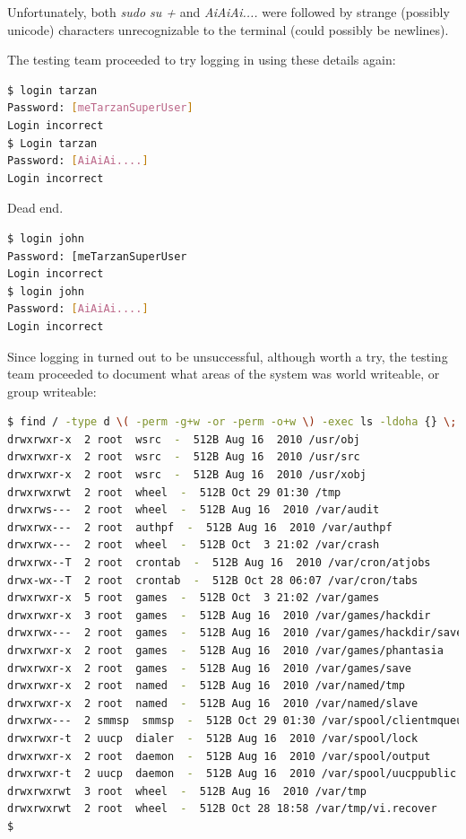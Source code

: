 Unfortunately, both \textit{sudo su +} and \textit{AiAiAi....} were followed by strange (possibly unicode) characters unrecognizable to the terminal (could possibly be newlines).

The testing team proceeded to try logging in using these details again:

\begin{lstlisting}[language=bash,caption={Logging in as tarzan}]
$ login tarzan
Password: [meTarzanSuperUser]
Login incorrect
$ Login tarzan
Password: [AiAiAi....]
Login incorrect
\end{lstlisting}

Dead end. 

\begin{lstlisting}[language=bash,caption={Logging in as john}]
$ login john
Password: [meTarzanSuperUser
Login incorrect
$ login john
Password: [AiAiAi....]
Login incorrect
\end{lstlisting}

Since logging in turned out to be unsuccessful, although worth a try, the testing team proceeded to document what areas of the system was world writeable, or group writeable:
\begin{lstlisting}[language=bash,caption={Where can we go?}]
$ find / -type d \( -perm -g+w -or -perm -o+w \) -exec ls -ldoha {} \;
drwxrwxr-x  2 root  wsrc  -  512B Aug 16  2010 /usr/obj
drwxrwxr-x  2 root  wsrc  -  512B Aug 16  2010 /usr/src
drwxrwxr-x  2 root  wsrc  -  512B Aug 16  2010 /usr/xobj
drwxrwxrwt  2 root  wheel  -  512B Oct 29 01:30 /tmp
drwxrws---  2 root  wheel  -  512B Aug 16  2010 /var/audit
drwxrwx---  2 root  authpf  -  512B Aug 16  2010 /var/authpf
drwxrwx---  2 root  wheel  -  512B Oct  3 21:02 /var/crash
drwxrwx--T  2 root  crontab  -  512B Aug 16  2010 /var/cron/atjobs
drwx-wx--T  2 root  crontab  -  512B Oct 28 06:07 /var/cron/tabs
drwxrwxr-x  5 root  games  -  512B Oct  3 21:02 /var/games
drwxrwxr-x  3 root  games  -  512B Aug 16  2010 /var/games/hackdir
drwxrwx---  2 root  games  -  512B Aug 16  2010 /var/games/hackdir/save
drwxrwxr-x  2 root  games  -  512B Aug 16  2010 /var/games/phantasia
drwxrwxr-x  2 root  games  -  512B Aug 16  2010 /var/games/save
drwxrwxr-x  2 root  named  -  512B Aug 16  2010 /var/named/tmp
drwxrwxr-x  2 root  named  -  512B Aug 16  2010 /var/named/slave
drwxrwx---  2 smmsp  smmsp  -  512B Oct 29 01:30 /var/spool/clientmqueue
drwxrwxr-t  2 uucp  dialer  -  512B Aug 16  2010 /var/spool/lock
drwxrwxr-x  2 root  daemon  -  512B Aug 16  2010 /var/spool/output
drwxrwxr-t  2 uucp  daemon  -  512B Aug 16  2010 /var/spool/uucppublic
drwxrwxrwt  3 root  wheel  -  512B Aug 16  2010 /var/tmp
drwxrwxrwt  2 root  wheel  -  512B Oct 28 18:58 /var/tmp/vi.recover
$ 
\end{lstlisting}

